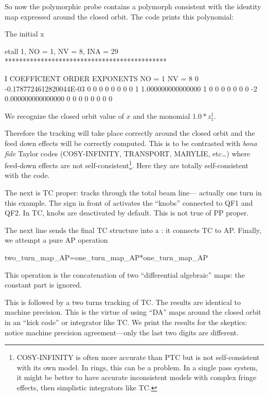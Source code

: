 \documentclass{hitec}     %
\begin{document}
{{So now the polymorphic probe  contains a polymorph consistent with  the identity map expressed around the closed orbit.  The code prints this polynomial:
\renewcommand{\codefont}{\footnotesize}
\begin{code}
  The initial x

 etall    1, NO =    1, NV =    8, INA =   29
 *********************************************

    I  COEFFICIENT          ORDER   EXPONENTS
      NO =     1      NV =     8
   0 -0.1787724612820044E-03   0  0  0  0  0  0  0  0
   1   1.000000000000000       1  0  0  0  0  0  0  0
    -2   0.000000000000000       0  0  0  0  0  0  0  0
   \end{code} 
We recognize the closed orbit value of $x$ and the monomial     $1.0*z_1^1$.
    
    
    Therefore the tracking will take place correctly around the closed orbit and the feed down effects will be correctly computed. This is to be contrasted with {\it bona fide} Taylor codes (COSY-INFINITY, TRANSPORT, MARYLIE, etc\ldots) where feed-down effects are not self-consistent\footnote{COSY-INFINITY is often more accurate than PTC but is not self-consistent with its own model. In rings, this can be a  problem. In a single pass system, it might be better to have accurate inconsistent models with complex fringe effects, then simplistic integrators like TC.}. Here they are totally self-consistent with the code. 



The next is TC proper:  tracks through the total beam line--- actually one turn in this example. The \vn{+} sign in front of 
   activates the ``knobs'' connected to QF1 and QF2. In TC, knobs are deactivated by default. This is not true of PP proper.
 
 The next line  sends the final TC structure  into a : it connects TC to AP. Finally, we attempt a pure AP operation
\begin{code}
two_turn_map_AP=one_turn_map_AP*one_turn_map_AP 
\end{code}

This operation is  the concatenation of two ``differential algebraic'' maps: the constant part is ignored.

This is followed by a two turns tracking of TC. The results are identical to machine precision. This is the virtue of using ``DA'' maps around the closed orbit in an ``kick code'' or integrator like TC. We print the results for the skeptics: notice machine precision agreement---only the last two digits are different.

}}
\end{document}

